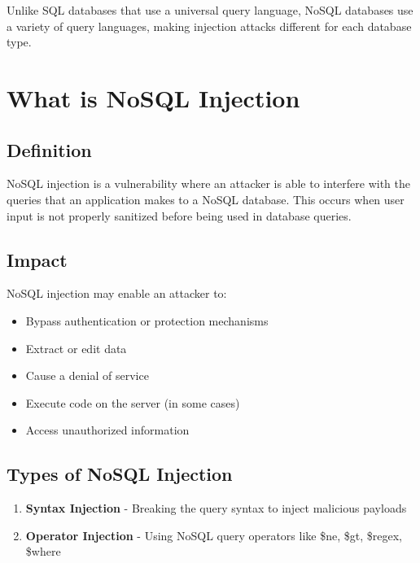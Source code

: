 \documentclass[12pt]{article}
\begin{document}
\begin{infobox}
Unlike SQL databases that use a universal query language, NoSQL databases use a variety of query languages, making injection attacks different for each database type.
\end{infobox}

\section{What is NoSQL Injection}

\subsection{Definition}

NoSQL injection is a vulnerability where an attacker is able to interfere with the queries that an application makes to a NoSQL database. This occurs when user input is not properly sanitized before being used in database queries.

\subsection{Impact}

NoSQL injection may enable an attacker to:

\begin{itemize}
    \item Bypass authentication or protection mechanisms
    \item Extract or edit data
    \item Cause a denial of service
    \item Execute code on the server (in some cases)
    \item Access unauthorized information
\end{itemize}

\subsection{Types of NoSQL Injection}

\begin{enumerate}
    \item \textbf{Syntax Injection} - Breaking the query syntax to inject malicious payloads
    \item \textbf{Operator Injection} - Using NoSQL query operators like \$ne, \$gt, \$regex, \$where
\end{enumerate}
\end{document}
